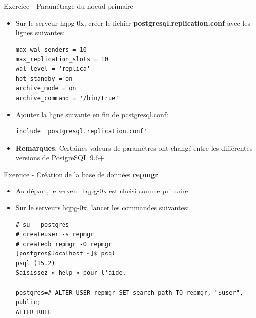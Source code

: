 
\begin{frame}[fragile]{Exercice - Paramétrage du noeud primaire}

   \begin{itemize}
      \item Sur le serveur hqpg-0x, créer le fichier \textbf{postgresql.replication.conf} avec les lignes suivantes:
\begin{tiny}
\begin{Verbatim}[commandchars=\\\{\}]
max_wal_senders = 10
max_replication_slots = 10
wal_level = 'replica'
hot_standby = on
archive_mode = on
archive_command = '/bin/true'
\end{Verbatim}
\end{tiny}
      \item Ajouter la ligne suivante en fin de postgresql.conf:
\begin{tiny}
\begin{Verbatim}[commandchars=\\\{\}]
include 'postgresql.replication.conf'
\end{Verbatim}
\end{tiny}
      \item \textbf{Remarques}: Certaines valeurs de paramètres ont changé entre les différentes versions de PostgreSQL 9.6+
   \end{itemize}


\begin{toile}
\end{toile}

\end{frame}


\begin{frame}[fragile]{Exercice - Création de la base de données \textbf{repmgr}}

   \begin{itemize}
      \item Au départ, le serveur hqpg-0x est choisi comme primaire
      \item Sur le serveurs hqpg-0x, lancer les commandes suivantes:
\begin{tiny}
\begin{Verbatim}[commandchars=\\\{\}]
# su - postgres
# createuser -s repmgr
# createdb repmgr -O repmgr
[postgres@localhost ~]$ psql
psql (15.2)
Saisissez « help » pour l'aide.

postgres=# ALTER USER repmgr SET search_path TO repmgr, "$user", public;
ALTER ROLE
\end{Verbatim}
\end{tiny}
   \end{itemize}

\end{frame}

